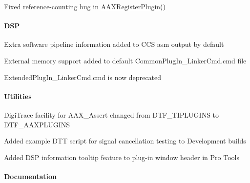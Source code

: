 \begin{DoxyItemize}
\item Fixed reference-\/counting bug in \hyperlink{a00326_ga83d05333118598c179ca6d89487fa203}{A\+A\+X\+Register\+Plugin()} 
\end{DoxyItemize}\hypertarget{a00375_aax_sdk_1p0p3_DSP}{}\paragraph{D\+S\+P}\label{a00375_aax_sdk_1p0p3_DSP}

\begin{DoxyItemize}
\item Extra software pipeline information added to C\+C\+S asm output by default 
\item External memory support added to default Common\+Plug\+In\+\_\+\+Linker\+Cmd.\+cmd file 
\begin{DoxyItemize}
\item Extended\+Plug\+In\+\_\+\+Linker\+Cmd.\+cmd is now deprecated 
\end{DoxyItemize}
\end{DoxyItemize}\hypertarget{a00375_aax_sdk_1p0p3_Utilities}{}\paragraph{Utilities}\label{a00375_aax_sdk_1p0p3_Utilities}

\begin{DoxyItemize}
\item Digi\+Trace facility for A\+A\+X\+\_\+\+Assert changed from D\+T\+F\+\_\+\+T\+I\+P\+L\+U\+G\+I\+N\+S to D\+T\+F\+\_\+\+A\+A\+X\+P\+L\+U\+G\+I\+N\+S 
\item Added example D\+T\+T script for signal cancellation testing to Development builds 
\item Added D\+S\+P information tooltip feature to plug-\/in window header in Pro Tools 
\end{DoxyItemize}\hypertarget{a00375_aax_sdk_1p0p3_Documentation}{}\paragraph{Documentation}\label{a00375_aax_sdk_1p0p3_Documentation}

